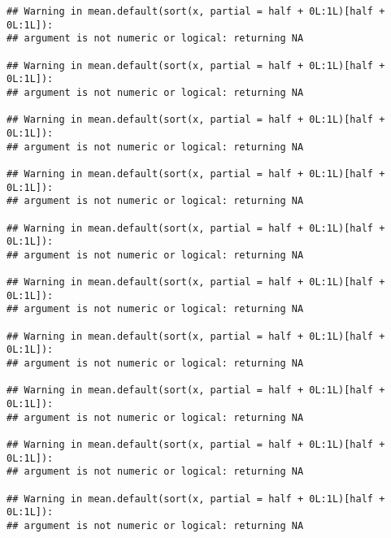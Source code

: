 \documentclass[
]{article}
\newenvironment{Shaded}{\begin{snugshade}}{\end{snugshade}}
\newcommand{\DecValTok}[1]{\textcolor[rgb]{0.00,0.00,0.81}{#1}}
\newcommand{\FunctionTok}[1]{\textcolor[rgb]{0.13,0.29,0.53}{\textbf{#1}}}
\newcommand{\NormalTok}[1]{#1}
\newcommand{\OtherTok}[1]{\textcolor[rgb]{0.56,0.35,0.01}{#1}}
\newcommand{\SpecialCharTok}[1]{\textcolor[rgb]{0.81,0.36,0.00}{\textbf{#1}}}
\newcommand{\StringTok}[1]{\textcolor[rgb]{0.31,0.60,0.02}{#1}}
\begin{document}
\begin{verbatim}
## Warning in mean.default(sort(x, partial = half + 0L:1L)[half + 0L:1L]):
## argument is not numeric or logical: returning NA

## Warning in mean.default(sort(x, partial = half + 0L:1L)[half + 0L:1L]):
## argument is not numeric or logical: returning NA

## Warning in mean.default(sort(x, partial = half + 0L:1L)[half + 0L:1L]):
## argument is not numeric or logical: returning NA

## Warning in mean.default(sort(x, partial = half + 0L:1L)[half + 0L:1L]):
## argument is not numeric or logical: returning NA

## Warning in mean.default(sort(x, partial = half + 0L:1L)[half + 0L:1L]):
## argument is not numeric or logical: returning NA

## Warning in mean.default(sort(x, partial = half + 0L:1L)[half + 0L:1L]):
## argument is not numeric or logical: returning NA

## Warning in mean.default(sort(x, partial = half + 0L:1L)[half + 0L:1L]):
## argument is not numeric or logical: returning NA

## Warning in mean.default(sort(x, partial = half + 0L:1L)[half + 0L:1L]):
## argument is not numeric or logical: returning NA

## Warning in mean.default(sort(x, partial = half + 0L:1L)[half + 0L:1L]):
## argument is not numeric or logical: returning NA

## Warning in mean.default(sort(x, partial = half + 0L:1L)[half + 0L:1L]):
## argument is not numeric or logical: returning NA
\end{verbatim}

\begin{Shaded}
\end{Shaded}
\end{document}
